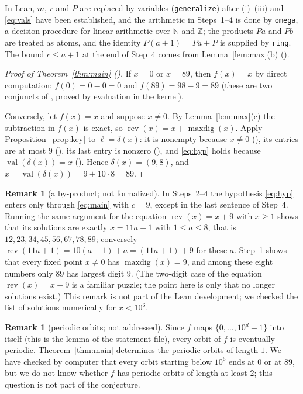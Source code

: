 \documentclass[11pt]{amsart}
\theoremstyle{plain}
\theoremstyle{definition}
\newtheorem{remark}[theorem]{Remark}
\newcommand{\N}{\mathbb{N}}
\newcommand{\Z}{\mathbb{Z}}
\newcommand{\rev}{\operatorname{rev}}
\newcommand{\maxdig}{\operatorname{maxdig}}
\newcommand{\val}{\operatorname{val}}
\begin{document}
In Lean, $m$, $r$ and $P$ are replaced by variables (\texttt{generalize}) after (i)--(iii) and \eqref{eq:vals} have been established, and the arithmetic in Steps~1--4 is done by \texttt{omega}, a decision procedure for linear arithmetic over $\N$ and $\Z$; the products $Pa$ and $Pb$ are treated as atoms, and the identity $P(a+1)=Pa+P$ is supplied by \texttt{ring}. The bound $c\le a+1$ at the end of Step~4 comes from Lemma~\ref{lem:max}(b) ().

\begin{proof}[Proof of Theorem~\ref{thm:main} ()]
If $x=0$ or $x=89$, then $f(x)=x$ by direct computation: $f(0)=0-0=0$ and $f(89)=98-9=89$ (these are two conjuncts of , proved by evaluation in the kernel).

Conversely, let $f(x)=x$ and suppose $x\ne0$. By Lemma~\ref{lem:max}(c) the subtraction in $f(x)$ is exact, so $\rev(x)=x+\maxdig(x)$. Apply Proposition~\ref{prop:key} to $\ell=\delta(x)$: it is nonempty because $x\ne0$ (), its entries are at most $9$ (), its last entry is nonzero (), and \eqref{eq:hyp} holds because $\val(\delta(x))=x$ (). Hence $\delta(x)=(9,8)$, and $x=\val(\delta(x))=9+10\cdot8=89$.
\end{proof}

\begin{remark}[a by-product; not formalized]\label{rem:plus9}
In Steps~2--4 the hypothesis \eqref{eq:hyp} enters only through \eqref{eq:main} with $c=9$, except in the last sentence of Step~4. Running the same argument for the equation $\rev(x)=x+9$ with $x\ge1$ shows that its solutions are exactly $x=11a+1$ with $1\le a\le8$, that is $12,23,34,45,56,67,78,89$; conversely $\rev(11a+1)=10(a+1)+a=(11a+1)+9$ for these $a$. Step~1 shows that every fixed point $x\ne0$ has $\maxdig(x)=9$, and among these eight numbers only $89$ has largest digit $9$. (The two-digit case of the equation $\rev(x)=x+9$ is a familiar puzzle; the point here is only that no longer solutions exist.) This remark is not part of the Lean development; we checked the list of solutions numerically for $x<10^6$.
\end{remark}

\begin{remark}[periodic orbits; not addressed]\label{rem:cycles}
Since $f$ maps $\{0,\dots,10^d-1\}$ into itself (this is the lemma  of the statement file), every orbit of $f$ is eventually periodic. Theorem~\ref{thm:main} determines the periodic orbits of length $1$. We have checked by computer that every orbit starting below $10^6$ ends at $0$ or at $89$, but we do not know whether $f$ has periodic orbits of length at least $2$; this question is not part of the conjecture.
\end{remark}
\end{document}

